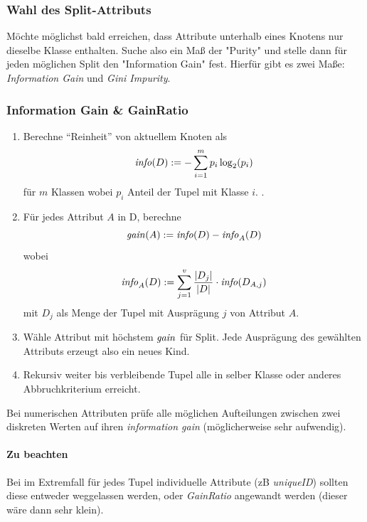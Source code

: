 \documentclass[10pt]{article} %
\DeclarePairedDelimiter\abs{\lvert}{\rvert}%
\begin{document}

\subsubsection{Wahl des Split-Attributs} 
Möchte möglichst bald erreichen, dass Attribute unterhalb eines Knotens nur dieselbe Klasse enthalten. Suche also ein Maß der "Purity" und stelle dann für jeden möglichen Split den "Information Gain" fest. Hierfür gibt es zwei Maße: \textit{Information Gain} und \textit{Gini Impurity}.

\subsubsection{Information Gain \& GainRatio}
\newcommand{\info}{\text{\textit{info}}}
   \newcommand{\gain}{\text{\textit{gain}}}
\begin{enumerate}
   
   \item Berechne ``Reinheit'' von aktuellem Knoten als 
   $$\info(D) := - \sum_{i=1}^{m} p_i \log_2(p_i)$$
   für $m$ Klassen wobei $p_i$ Anteil der Tupel mit Klasse $i$. .
% 
   \item Für jedes Attribut $A$ in D, berechne 
   $$\gain(A) := \info(D) - \info_A(D)$$
   wobei
   $$ \info_A(D) := \sum_{j=1}^{v} \frac{\abs{D_j}}{\abs{D}} \cdot \info(D_{A,j}) $$
   mit $D_j$ als Menge der Tupel mit Ausprägung $j$ von Attribut $A$.
   \item Wähle Attribut mit höchstem $\gain$ für Split. Jede Ausprägung des gewählten Attributs erzeugt also ein neues Kind.
   \item Rekursiv weiter bis verbleibende Tupel alle in selber Klasse oder anderes Abbruchkriterium erreicht.
\end{enumerate}

Bei numerischen Attributen prüfe alle möglichen Aufteilungen zwischen zwei diskreten Werten auf ihren \textit{information gain} (möglicherweise sehr aufwendig).

\paragraph{Zu beachten}
Bei im Extremfall für jedes Tupel individuelle Attribute (zB \textit{uniqueID}) sollten diese entweder weggelassen werden, oder \textit{GainRatio} angewandt werden (dieser wäre dann sehr klein).
\end{document}

